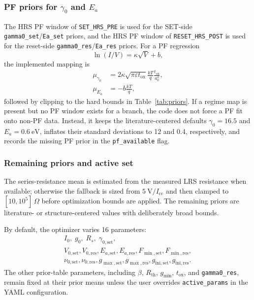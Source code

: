 \documentclass[journal]{IEEEtran}
\begin{document}
\subsubsection{PF priors for $\gamma_0$ and $E_a$}
The HRS PF window of \texttt{SET\_HRS\_PRE} is used for the SET-side
\texttt{gamma0\_set}/\texttt{Ea\_set} priors, and the HRS PF window of
\texttt{RESET\_HRS\_POST} is used for the reset-side
\texttt{gamma0\_res}/\texttt{Ea\_res} priors.  For a PF regression
\[
  \ln(I/V) = \kappa\sqrt{V}+b,
\]
the implemented mapping is
\begin{align}
  \mu_{\gamma_0}
  &=
  2\kappa\sqrt{\pi\varepsilon t_{\mathrm{ox}}}
  \frac{kT}{q}\frac{t_{\mathrm{ox}}}{a_0^2},
  \label{eq:gamma-prior}\\
  \mu_{E_a}
  &=
  -b\frac{kT}{q},
  \label{eq:ea-prior}
\end{align}
followed by clipping to the hard bounds in Table~\ref{tab:priors}.  If a
regime map is present but no PF window exists for a branch, the code does not
force a PF fit onto non-PF data.  Instead, it keeps the literature-centered
defaults $\gamma_0=16.5$ and $E_a=\SI{0.6}{\electronvolt}$, inflates their
standard deviations to 12 and 0.4, respectively, and records the missing PF
prior in the \texttt{pf\_available} flag.

\subsubsection{Remaining priors and active set}
The series-resistance mean is estimated from the measured LRS resistance when
available; otherwise the fallback is sized from
$\SI{5}{\volt}/I_{\mathrm{cc}}$ and then clamped to
$[10,10^5]\,\Omega$ before optimization bounds are applied.  The remaining
priors are literature- or structure-centered values with deliberately broad
bounds.

By default, the optimizer varies 16 parameters:
\[
\begin{gathered}
I_0,\; g_0,\; R_s,\; \gamma_{0,\mathrm{set}},\\
V_{0,\mathrm{set}}, V_{0,\mathrm{res}},
E_{a,\mathrm{set}}, E_{a,\mathrm{res}},
F_{\min,\mathrm{set}}, F_{\min,\mathrm{res}},\\
\nu_{0,\mathrm{set}}, \nu_{0,\mathrm{res}},
g_{\max,\mathrm{set}}, g_{\max,\mathrm{res}},
g_{\mathrm{ini,set}}, g_{\mathrm{ini,res}}.
\end{gathered}
\]
The other prior-table parameters, including $\beta$, $R_{\mathrm{th}}$,
$g_{\min}$, $t_{\mathrm{ox}}$, and \texttt{gamma0\_res}, remain fixed at their
prior means unless the user overrides \texttt{active\_params} in the YAML
configuration.
\end{document}
